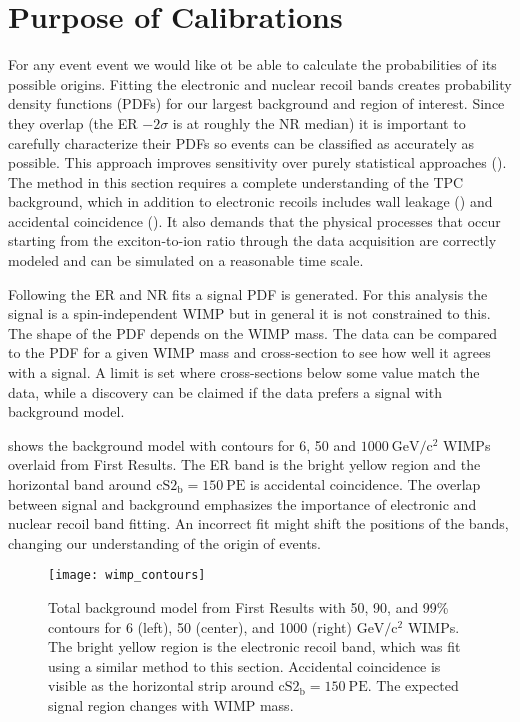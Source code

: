 \section{Purpose of Calibrations}
\label{sec:er_nr_calibrations_purpose}
For any event event we would like ot be able to calculate the probabilities of its possible origins.  Fitting the electronic and nuclear
recoil bands creates probability density functions (PDFs) for our largest background and region of interest.  Since they overlap
(the ER $-2\sigma$ is at roughly the NR median) it is important to carefully characterize their PDFs so events can be classified
as accurately as possible.  This approach improves sensitivity over
purely statistical approaches ().  The method in this section requires a complete understanding of the TPC
background, which
in addition to electronic recoils includes wall leakage () and accidental
coincidence ().  It also demands that
the physical processes that occur starting from the exciton-to-ion ratio through the data acquisition are correctly modeled and can be
simulated on a reasonable time scale.

Following the ER and NR fits a signal PDF is generated.  For this analysis the signal is a spin-independent WIMP but in general it is not
constrained to this.  The shape of the PDF depends on the WIMP mass.  The data can be compared
to the PDF for a given WIMP mass and cross-section to see how well it agrees with a signal.  A limit is set where
cross-sections below some value match the data, while a discovery can be claimed if the data prefers a signal with background model.

 shows the background model with contours for 6, 50 and $1000\ \mathrm{GeV/c^2}$
WIMPs overlaid from
First Results.  The ER band is the bright yellow region and the horizontal band around $\mathrm{cS2_b} = 150\ \mathrm{PE}$ is accidental
coincidence.  The overlap between signal and background emphasizes the importance of electronic and nuclear recoil band
fitting.  An incorrect fit might shift the positions of the bands, changing our understanding of the origin of events.

\begin{figure}
\centering
\texttt{[image: wimp\_contours]}
\caption{Total background model from First Results with 50, 90, and 99\% contours for 6 (left), 50 (center), and 1000 (right)
$\mathrm{GeV/c^2}$ WIMPs.  The bright yellow region is the
electronic recoil band, which was fit using a similar method to this section.  Accidental coincidence is visible as the horizontal strip
around $\mathrm{cS2_b} = 150\ \mathrm{PE}$.  The expected signal region changes with WIMP mass.}
\label{fig:er_nr_calibrations_purpose_wimp_contours}
\end{figure}



